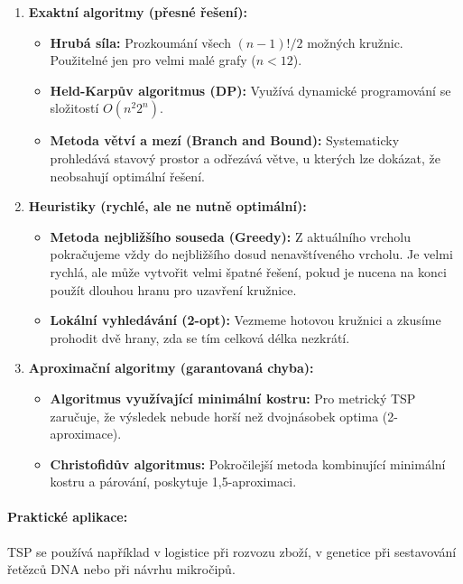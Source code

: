 \begin{enumerate}
    \item \textbf{Exaktní algoritmy (přesné řešení):}
    \begin{itemize}
        \item \textbf{Hrubá síla:} Prozkoumání všech $(n-1)! / 2$ možných kružnic. Použitelné jen pro velmi malé grafy ($n < 12$).
        \item \textbf{Held-Karpův algoritmus (DP):} Využívá dynamické programování se složitostí $O(n^2 2^n)$.
        \item \textbf{Metoda větví a mezí (Branch and Bound):} Systematicky prohledává stavový prostor a odřezává větve, u kterých lze dokázat, že neobsahují optimální řešení.
    \end{itemize}
    
    \item \textbf{Heuristiky (rychlé, ale ne nutně optimální):}
    \begin{itemize}
        \item \textbf{Metoda nejbližšího souseda (Greedy):} Z aktuálního vrcholu pokračujeme vždy do nejbližšího dosud nenavštíveného vrcholu. Je velmi rychlá, ale může vytvořit velmi špatné řešení, pokud je nucena na konci použít dlouhou hranu pro uzavření kružnice.
        \item \textbf{Lokální vyhledávání (2-opt):} Vezmeme hotovou kružnici a zkusíme prohodit dvě hrany, zda se tím celková délka nezkrátí.
    \end{itemize}

    \item \textbf{Aproximační algoritmy (garantovaná chyba):}
    \begin{itemize}
        \item \textbf{Algoritmus využívající minimální kostru:} Pro metrický TSP zaručuje, že výsledek nebude horší než dvojnásobek optima (2-aproximace).
        \item \textbf{Christofidův algoritmus:} Pokročilejší metoda kombinující minimální kostru a párování, poskytuje 1,5-aproximaci.
    \end{itemize}
\end{enumerate}

\paragraph*{Praktické aplikace:} TSP se používá například v logistice při rozvozu zboží, v genetice při sestavování řetězců DNA nebo při návrhu mikročipů.

